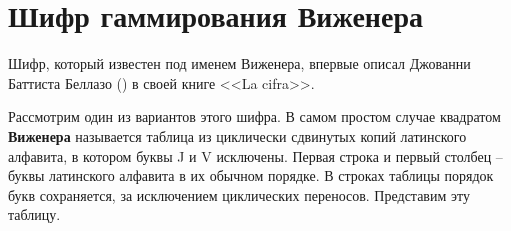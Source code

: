 \section{Шифр гаммирования Виженера}

Шифр, который известен под именем Виженера, впервые описал Джованни Баттиста Беллазо () в своей книге <<La cifra>>.

Рассмотрим один из вариантов этого шифра. В самом простом случае квадратом \textbf{Виженера} называется таблица из циклически сдвинутых копий латинского алфавита, в котором буквы J и V исключены. Первая строка и первый столбец -- буквы латинского алфавита в их обычном порядке. В строках таблицы порядок букв сохраняется, за исключением циклических переносов. Представим эту таблицу.

